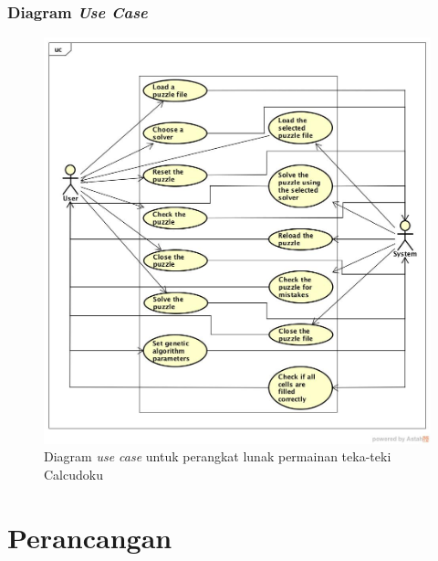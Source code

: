 \documentclass{beamer}
\begin{document}
\begin{frame}
\frametitle{Diagram \textit{Use Case}}
\begin{figure}
\centering
\captionsetup{justification=centering}
\includegraphics[scale=0.2]{Gambar/Analisis/DiagramUseCase}
\caption[Diagram \textit{use case} untuk perangkat lunak permainan teka-teki Calcudoku]{Diagram \textit{use case} untuk perangkat lunak permainan teka-teki Calcudoku}
\label{fig:analisisusecase}
\end{figure}
\end{frame}

\note{

}

\section{Perancangan}
\end{document}
